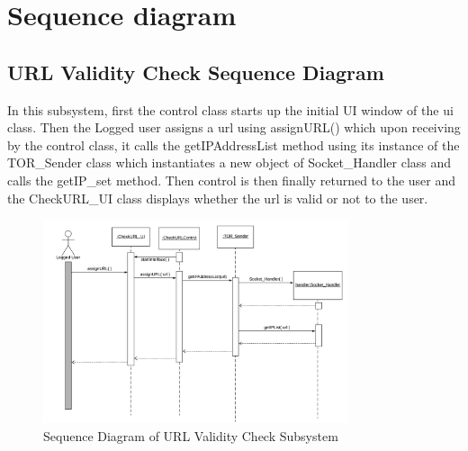 \documentclass[12pt]{article}
\begin{document}
\newpage
\section{Sequence diagram}
\subsection{URL Validity Check Sequence Diagram}
In this subsystem, first the control class starts up the initial UI window of the ui class. Then the Logged user assigns a url using assignURL() which upon receiving by the control class, it calls the getIPAddressList method using its instance of the TOR\_Sender class which instantiates a new object of Socket\_Handler class and calls the getIP\_set method. Then control is then finally returned to the user and the CheckURL\_UI class displays whether the url is valid or not to the user.
\begin{figure}[h]
    \centering
    \includegraphics[width=0.8\textwidth]{seq1.png}
    \caption{Sequence Diagram of URL Validity Check Subsystem}
    \label{fig:sdvc}
\end{figure}


\newpage
\end{document}
